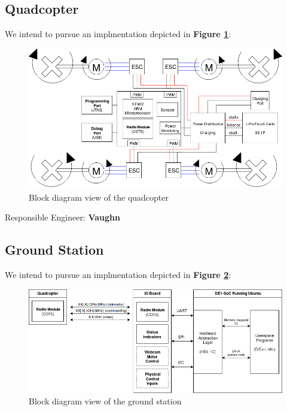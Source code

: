 \documentclass{article}
\begin{document}
\subsection{Quadcopter}

We intend to pursue an implmentation depicted in
\textbf{Figure \ref{fig:quadcopter}}:

\begin{figure}[H]
	\centering
	\includegraphics[width=\linewidth]{../src/im/quadcopter}
	\caption{Block diagram view of the quadcopter}
	\label{fig:quadcopter}
\end{figure}

{\large Responsible Engineer: \textbf{Vaughn}}

\pagebreak

\subsection{Ground Station}

We intend to pursue an implmentation depicted in
\textbf{Figure \ref{fig:ground_station}}:

\begin{figure}[H]
	\centering
	\includegraphics[width=\linewidth]{../src/im/ground_station}
	\caption{Block diagram view of the ground station}
	\label{fig:ground_station}
\end{figure}
\end{document}
